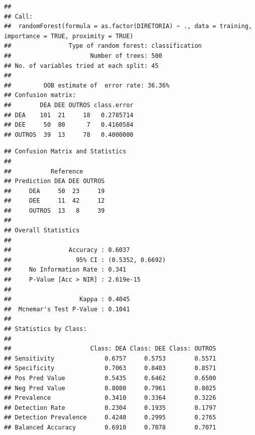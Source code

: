 \documentclass[]{article}
\newenvironment{Shaded}{\begin{snugshade}}{\end{snugshade}}
\newcommand{\KeywordTok}[1]{\textcolor[rgb]{0.13,0.29,0.53}{\textbf{#1}}}
\newcommand{\DataTypeTok}[1]{\textcolor[rgb]{0.13,0.29,0.53}{#1}}
\newcommand{\StringTok}[1]{\textcolor[rgb]{0.31,0.60,0.02}{#1}}
\newcommand{\CommentTok}[1]{\textcolor[rgb]{0.56,0.35,0.01}{\textit{#1}}}
\newcommand{\OperatorTok}[1]{\textcolor[rgb]{0.81,0.36,0.00}{\textbf{#1}}}
\newcommand{\NormalTok}[1]{#1}
\begin{document}
\begin{verbatim}
## 
## Call:
##  randomForest(formula = as.factor(DIRETORIA) ~ ., data = training,      importance = TRUE, proximity = TRUE) 
##                Type of random forest: classification
##                      Number of trees: 500
## No. of variables tried at each split: 45
## 
##         OOB estimate of  error rate: 36.36%
## Confusion matrix:
##        DEA DEE OUTROS class.error
## DEA    101  21     18   0.2785714
## DEE     50  80      7   0.4160584
## OUTROS  39  13     78   0.4000000
\end{verbatim}

\begin{Shaded}
\end{Shaded}

\begin{verbatim}
## Confusion Matrix and Statistics
## 
##           Reference
## Prediction DEA DEE OUTROS
##     DEA     50  23     19
##     DEE     11  42     12
##     OUTROS  13   8     39
## 
## Overall Statistics
##                                           
##                Accuracy : 0.6037          
##                  95% CI : (0.5352, 0.6692)
##     No Information Rate : 0.341           
##     P-Value [Acc > NIR] : 2.619e-15       
##                                           
##                   Kappa : 0.4045          
##  Mcnemar's Test P-Value : 0.1041          
## 
## Statistics by Class:
## 
##                      Class: DEA Class: DEE Class: OUTROS
## Sensitivity              0.6757     0.5753        0.5571
## Specificity              0.7063     0.8403        0.8571
## Pos Pred Value           0.5435     0.6462        0.6500
## Neg Pred Value           0.8080     0.7961        0.8025
## Prevalence               0.3410     0.3364        0.3226
## Detection Rate           0.2304     0.1935        0.1797
## Detection Prevalence     0.4240     0.2995        0.2765
## Balanced Accuracy        0.6910     0.7078        0.7071
\end{verbatim}
\end{document}
